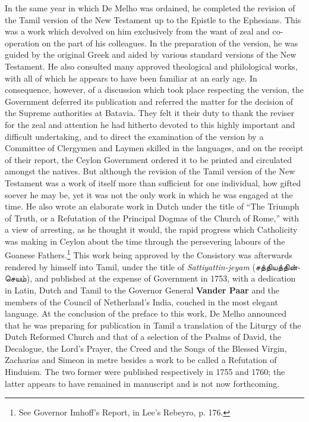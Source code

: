 \documentclass{article}
\newcommand{\TamilText}[1]{\texttamil{#1}}
\newcommand{\tam}[1]{\TamilText{#1}}
\begin{document}
In the same year in which De Melho was ordained, he completed the revision of the Tamil version of the New Testament up to the Epistle to the Ephesians. This was a work which devolved on him exclusively from the want of zeal and co-operation on the part of his colleagues. In the preparation of the version, he was guided by the original Greek and aided by various standard versions of the New Testament. He also consulted many approved theological and philological works, with all of which he appears to have been familiar at an early age. In consequence, however, of a discussion which took place respecting the version, the Government deferred its publication and referred the matter for the decision of the Supreme authorities at Batavia. They felt it their duty to thank the reviser for the zeal and attention he had hitherto devoted to this highly important and difficult undertaking, and to direct the examination of the version by a Committee of Clergymen and Laymen skilled in the languages, and on the receipt of their report, the Ceylon Government ordered it to be printed and circulated amongst the natives. But although the revision of the Tamil version of the New Testament was a work of itself more than sufficient for one individual, how gifted soever he may be, yet it was not the only work in which he was engaged at the time. He also wrote an elaborate work in Dutch under the title of ``The Triumph of Truth, or a Refutation of the Principal Dogmas of the Church of Rome,'' with a view of arresting, as he thought it would, the rapid progress which Catholicity was making in Ceylon about the time through the persevering labours of the Goanese Fathers.\footnote{See Governor Imhoff's Report, in Lee's Rebeyro, p. 176.} This work being approved by the Consistory was afterwards rendered by himself into Tamil, under the title of \emph{Sattiyattin-jeyam} (\tam{சத்தியத்தின்செயம்}), and published at the expense of Government in 1753, with a dedication in Latin, Dutch and Tamil to the Governor General \textbf{Vander Paar} and the members of the Council of Netherland's India, couched in the most elegant language. At the conclusion of the preface to this work, De Melho announced that he was preparing for publication in Tamil a translation of the Liturgy of the Dutch Reformed Church and that of a selection of the Psalms of David, the Decalogue, the Lord's Prayer, the Creed and the Songs of the Blessed Virgin, Zacharias and Simeon in metre besides a work to be called a Refutation of Hinduism. The two former were published respectively in 1755 and 1760; the latter appears to have remained in manuscript and is not now forthcoming.
\end{document}
